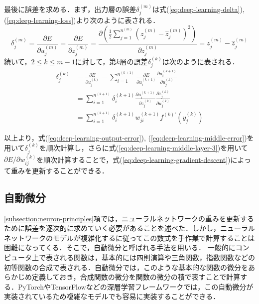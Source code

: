 最後に誤差を求める．まず，出力層の誤差$\delta_j^{(m)}$は式(\ref{eq:deep-learning-delta}), (\ref{eq:deep-learning-loss})より次のように表される．
\begin{equation}
  \delta_j^{(m)} = \frac{\partial E}{\partial u_j^{(m)}} =
  \frac{\partial E}{\partial z_j^{(m)}} =
  \frac{\partial \left( \frac{1}{2} \sum_{j=1}^{n^{(m)}} \left( z_j^{(m)} - \hat{z}_j^{(m)} \right)^2 \right)} {\partial z_j^{(m)}} =
  z_j^{(m)} - \hat{z}_j^{(m)}
  \label{eq:deep-learning-output-error}
\end{equation}
続いて，$2 \leq k \leq m-1$に対して，第$k$層の誤差$\delta_j^{(k)}$は次のように表される．
\begin{equation}
  \begin{split}
  \delta_j^{(k)} &= \frac{\partial E}{\partial u_j^{(k)}} =
  \sum_{i=1}^{n^{(k+1)}} \frac{\partial E}{\partial u_i^{(k+1)}} \frac{\partial u_i^{(k+1)}} {\partial u_j^{(k)}} \\ &=
  \sum_{i=1}^{n^{(k+1)}} \delta_i^{(k+1)} \frac{\partial u_i^{(k+1)}} {\partial z_j^{(k)}} \frac{\partial z_j^{(k)}} {\partial u_j^{(k)}} \\ &=
  \sum_{i=1}^{n^{(k+1)}} \delta_i^{(k+1)} w_{ji}^{(k+1)} f^{(k)\prime}(y_j^{(k)})
  \end{split}
  \label{eq:deep-learning-middle-error}
\end{equation}

以上より，式(\ref{eq:deep-learning-output-error}), (\ref{eq:deep-learning-middle-error})を用いて$\delta_j^{(k)}$を順次計算し，さらに式(\ref{eq:deep-learning-middle-layer-3})を用いて$\partial E / \partial w_{ij}^{(k)}$を順次計算することで，式(\ref{eq:deep-learning-gradient-descent})によって重みを更新することができる．

\subsection{自動微分 \label{subsection:automatic-differentiation}}
\ref{subsection:neuron-principles}項では，ニューラルネットワークの重みを更新するために誤差を逐次的に求めていく必要があることを述べた．しかし，ニューラルネットワークのモデルが複雑化するに従ってこの数式を手作業で計算することは困難になってくる．そこで，自動微分と呼ばれる手法を用いる．
一般的にコンピュータ上で表される関数は，基本的には四則演算や三角関数，指数関数などの初等関数の合成で表される\cite{10.5555/3122009.3242010}．自動微分では，このような基本的な関数の微分をあらかじめ定義しておき，合成関数の微分を関数の微分の積で表すことで計算する\cite{10.5555/3122009.3242010}．PyTorch\cite{NEURIPS2019-9015}やTensorFlow\cite{tensorflow2015-whitepaper}などの深層学習フレームワークでは，この自動微分が実装されているため複雑なモデルでも容易に実装することができる．

